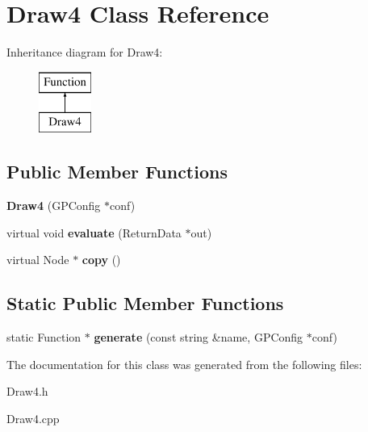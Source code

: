 \hypertarget{class_draw4}{\section{Draw4 Class Reference}
\label{class_draw4}
}
Inheritance diagram for Draw4\-:\begin{figure}[H]
\begin{center}
\leavevmode
\includegraphics[height=2.000000cm]{class_draw4}
\end{center}
\end{figure}
\subsection*{Public Member Functions}
\begin{DoxyCompactItemize}
\item 
\hypertarget{class_draw4_a30a878a94519eb6c291629927d5edf5d}{{\bfseries Draw4} (G\-P\-Config $\ast$conf)}\label{class_draw4_a30a878a94519eb6c291629927d5edf5d}

\item 
\hypertarget{class_draw4_a2eeefbe82ec2b6fef14e8bd5947c02ac}{virtual void {\bfseries evaluate} (Return\-Data $\ast$out)}\label{class_draw4_a2eeefbe82ec2b6fef14e8bd5947c02ac}

\item 
\hypertarget{class_draw4_a6e4128cfa6b2b59dd08eb7e25da03f2e}{virtual Node $\ast$ {\bfseries copy} ()}\label{class_draw4_a6e4128cfa6b2b59dd08eb7e25da03f2e}

\end{DoxyCompactItemize}
\subsection*{Static Public Member Functions}
\begin{DoxyCompactItemize}
\item 
\hypertarget{class_draw4_a125086be4643dd452fc5f952a61f9e83}{static Function $\ast$ {\bfseries generate} (const string \&name, G\-P\-Config $\ast$conf)}\label{class_draw4_a125086be4643dd452fc5f952a61f9e83}

\end{DoxyCompactItemize}


The documentation for this class was generated from the following files\-:\begin{DoxyCompactItemize}
\item 
Draw4.\-h\item 
Draw4.\-cpp\end{DoxyCompactItemize}

